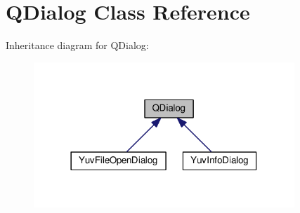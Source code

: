 \hypertarget{classGUI_1_1QDialog}{}\section{Q\+Dialog Class Reference}
\label{classGUI_1_1QDialog}


Inheritance diagram for Q\+Dialog\+:
\nopagebreak
\begin{figure}[H]
\begin{center}
\leavevmode
\includegraphics[width=278pt]{classGUI_1_1QDialog__inherit__graph}
\end{center}
\end{figure}

